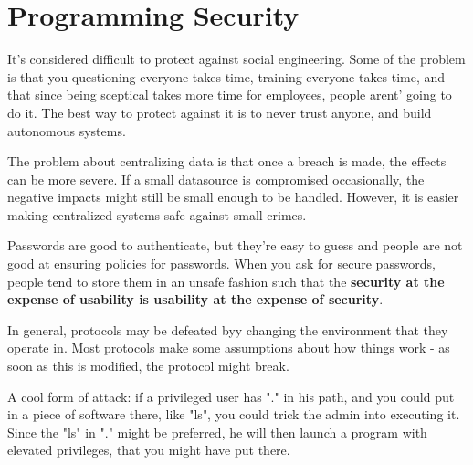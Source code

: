 \section{Programming Security}
It's considered difficult to protect against social engineering.
Some of the problem is that you questioning everyone takes time,
training everyone takes time, and that since being sceptical takes more
time for employees, people arent' going to do it. The best way
to protect against it is to never trust anyone, and build autonomous systems.

The problem about centralizing data is that once a breach is made, the effects
can be more severe. If a small datasource is compromised occasionally, the
negative impacts might still be small enough to be handled. However,
it is easier making centralized systems safe against small crimes.
\newline

Passwords are good to authenticate, but they're easy to guess and 
people are not good at ensuring policies for passwords. When you ask for
secure passwords, people tend to store them in an unsafe fashion such that
the \textbf{security at the expense of usability is usability at the expense
of security}.

In general, protocols may be defeated byy changing the environment 
that they operate in. Most protocols make some assumptions about how
things work - as soon as this is modified, the protocol might break.

A cool form of attack: if a privileged user has "." in his path, and you
could put in a piece of software there, like "ls", you could trick the admin
into executing it. Since the "ls" in "." might be preferred, he will then launch
a program with elevated privileges, that you might have put there.
